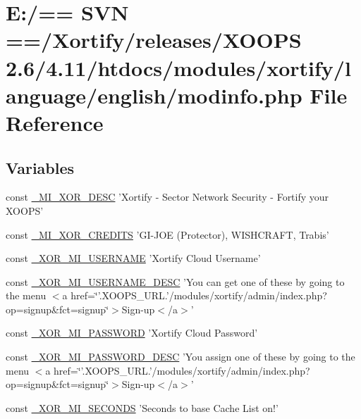 \hypertarget{modinfo_8php}{\section{E\-:/== S\-V\-N ==/\-Xortify/releases/\-X\-O\-O\-P\-S 2.6/4.11/htdocs/modules/xortify/language/english/modinfo.php File Reference}
\label{modinfo_8php}
}
\subsection*{Variables}
\begin{DoxyCompactItemize}
\item 
const \hyperlink{modinfo_8php_ad67726f7fdc3379977791dbae46e7a2e}{\-\_\-\-M\-I\-\_\-\-X\-O\-R\-\_\-\-D\-E\-S\-C} 'Xortify -\/ Sector Network Security -\/ Fortify your X\-O\-O\-P\-S'
\item 
const \hyperlink{modinfo_8php_abed4f2d9574815f82f828253c69b3045}{\-\_\-\-M\-I\-\_\-\-X\-O\-R\-\_\-\-C\-R\-E\-D\-I\-T\-S} 'G\-I-\/J\-O\-E (Protector), W\-I\-S\-H\-C\-R\-A\-F\-T, Trabis'
\item 
const \hyperlink{modinfo_8php_a3e1d80b4ffcc3e529cbb0a2c3e2890f1}{\-\_\-\-X\-O\-R\-\_\-\-M\-I\-\_\-\-U\-S\-E\-R\-N\-A\-M\-E} 'Xortify Cloud Username'
\item 
const \hyperlink{modinfo_8php_a5b188b1e94189bc17f0be9b90f49c697}{\-\_\-\-X\-O\-R\-\_\-\-M\-I\-\_\-\-U\-S\-E\-R\-N\-A\-M\-E\-\_\-\-D\-E\-S\-C} 'You can get one of these by going to the menu $<$a href=\char`\"{}'.X\-O\-O\-P\-S\-\_\-\-U\-R\-L.'/modules/xortify/admin/index.\-php?op=signup\&fct=signup\char`\"{}$>$Sign-\/up$<$/a$>$'
\item 
const \hyperlink{modinfo_8php_a9ba56b46a075ab7de713ffc49801aee1}{\-\_\-\-X\-O\-R\-\_\-\-M\-I\-\_\-\-P\-A\-S\-S\-W\-O\-R\-D} 'Xortify Cloud Password'
\item 
const \hyperlink{modinfo_8php_a36129160e698bb9b12591e4b669c59c6}{\-\_\-\-X\-O\-R\-\_\-\-M\-I\-\_\-\-P\-A\-S\-S\-W\-O\-R\-D\-\_\-\-D\-E\-S\-C} 'You assign one of these by going to the menu $<$a href=\char`\"{}'.X\-O\-O\-P\-S\-\_\-\-U\-R\-L.'/modules/xortify/admin/index.\-php?op=signup\&fct=signup\char`\"{}$>$Sign-\/up$<$/a$>$'
\item 
const \hyperlink{modinfo_8php_a146acc4cd72e94a6ea2b7f9bd7930d55}{\-\_\-\-X\-O\-R\-\_\-\-M\-I\-\_\-\-S\-E\-C\-O\-N\-D\-S} 'Seconds to base Cache List on!'

\end{DoxyCompactItemize}
